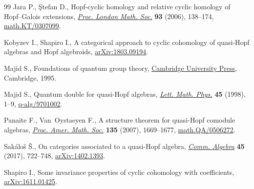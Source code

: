 \documentclass[pdftex]{sigma}
\numberwithin{equation}{section}
\begin{document}
\begin{thebibliography}{99}
Jara P., \c{S}tefan D., Hopf-cyclic homology and relative cyclic homology of
 {H}opf--{G}alois extensions, \href{https://doi.org/10.1017/S0024611506015772}{\textit{Proc. London Math. Soc.}} \textbf{93}
 (2006), 138--174, \href{https://arxiv.org/abs/math.KT/0307099}{math.KT/0307099}.

Kobyzev I., Shapiro I., A categorical approach to cyclic cohomology of
 quasi-{H}opf algebras and {H}opf algebroids, \href{https://arxiv.org/abs/1803.09194}{arXiv:1803.09194}.

Majid S., Foundations of quantum group theory, \href{https://doi.org/10.1017/CBO9780511613104}{Cambridge University Press},
 Cambridge, 1995.

Majid S., Quantum double for quasi-{H}opf algebras, \href{https://doi.org/10.1023/A:1007450123281}{\textit{Lett. Math. Phys.}}
 \textbf{45} (1998), 1--9, \href{https://arxiv.org/abs/q-alg/9701002}{q-alg/9701002}.

Panaite F., Van~Oystaeyen F., A structure theorem for quasi-{H}opf comodule
 algebras, \href{https://doi.org/10.1090/S0002-9939-07-08712-6}{\textit{Proc. Amer. Math. Soc.}} \textbf{135} (2007), 1669--1677,
 \href{https://arxiv.org/abs/math.QA/0506272}{math.QA/0506272}.

Sak\'alo\v{s} {\v{S}}., On categories associated to a quasi-{H}opf algebra,
 \href{https://doi.org/10.1080/00927872.2016.1175449}{\textit{Comm. Algebra}} \textbf{45} (2017), 722--748, \href{https://arxiv.org/abs/1402.1393}{arXiv:1402.1393}.

Shapiro I., Some invariance properties of cyclic cohomology with coefficients,
 \href{https://arxiv.org/abs/1611.01425}{arXiv:1611.01425}.

\end{thebibliography}\LastPageEnding
\end{document}
